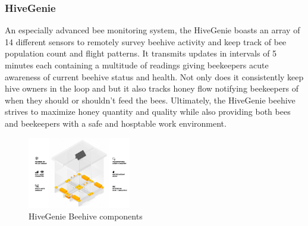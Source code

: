 \documentclass[12pt]{article}
\begin{document}
	\subsubsection{HiveGenie}
	An especially advanced bee monitoring system, the HiveGenie boasts an array of 14 different sensors to remotely survey beehive activity and keep track of bee population count and flight patterns\cite{HiveGenie}. It transmits updates in intervals of 5 minutes each containing a multitude of readings giving beekeepers acute awareness of current beehive status and health. Not only does it consistently keep hive owners in the loop and but it also tracks honey flow notifying beekeepers of when they should or shouldn't feed the bees. Ultimately, the HiveGenie beehive strives to maximize honey quantity and quality while also providing both bees and beekeepers with a safe and hosptable work environment.
	\begin{figure}[H]
		\centering
		\includegraphics[width=0.4\textwidth]{Images/Simillar/hive-benefits.jpg}
		\caption{HiveGenie Beehive components \cite{HiveGenie}}
		\label{fig:HIVEGENIE_HIVE}
	\end{figure}
	
\end{document}
